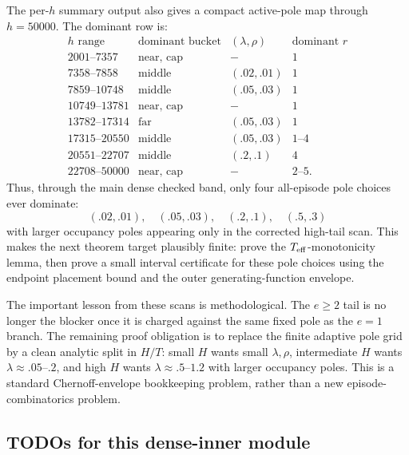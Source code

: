 The per-\(h\) summary output also gives a compact active-pole map through \(h=50000\).  The dominant row is:
\[
\begin{array}{c|c|c|c}
h\text{ range} & \text{dominant bucket} & (\lambda,\rho) & \text{dominant }r\\
\hline
2001\text{--}7357 & \text{near, cap} & - & 1\\
7358\text{--}7858 & \text{middle} & (.02,.01) & 1\\
7859\text{--}10748 & \text{middle} & (.05,.03) & 1\\
10749\text{--}13781 & \text{near, cap} & - & 1\\
13782\text{--}17314 & \text{far} & (.05,.03) & 1\\
17315\text{--}20550 & \text{middle} & (.05,.03) & 1\text{--}4\\
20551\text{--}22707 & \text{middle} & (.2,.1) & 4\\
22708\text{--}50000 & \text{near, cap} & - & 2\text{--}5 .
\end{array}
\]
Thus, through the main dense checked band, only four all-episode pole choices ever dominate:
\[
(.02,.01),\quad (.05,.03),\quad (.2,.1),\quad (.5,.3)
\]
with larger occupancy poles appearing only in the corrected high-tail scan.  This makes the next theorem target
plausibly finite: prove the \(T_{\rm eff}\)-monotonicity lemma, then prove a small interval certificate for these pole
choices using the endpoint placement bound and the outer generating-function envelope.

The important lesson from these scans is methodological.  The \(e\ge2\) tail is no longer the blocker once it is
charged against the same fixed pole as the \(e=1\) branch.  The remaining proof obligation is to replace the finite
adaptive pole grid by a clean analytic split in \(H/T\): small \(H\) wants small \(\lambda,\rho\), intermediate \(H\)
wants \(\lambda\approx .05\text{--}.2\), and high \(H\) wants \(\lambda\approx .5\text{--}1.2\) with larger occupancy
poles.  This is a standard Chernoff-envelope bookkeeping problem, rather than a new episode-combinatorics problem.

\subsection{TODOs for this dense-inner module}
\label{subsec:inner-dense-todos}

